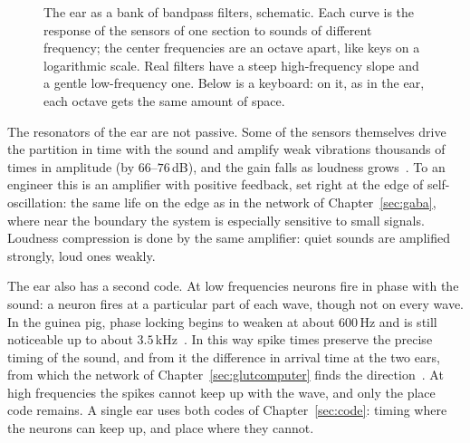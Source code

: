 \begin{figure}[t]
\centering
{}
\caption{The ear as a bank of bandpass filters, schematic. Each curve is the response of the sensors of one section to sounds of different frequency; the center frequencies are an octave apart, like keys on a logarithmic scale. Real filters have a steep high-frequency slope and a gentle low-frequency one. Below is a keyboard: on it, as in the ear, each octave gets the same amount of space.}
\label{fig:filterbank}
\end{figure}

The resonators of the ear are not passive. Some of the sensors themselves drive the partition in time with the sound and amplify weak vibrations thousands of times in amplitude (by $66$--$76$\,dB), and the gain falls as loudness grows~\cite{Ruggero1997,Robles2001}. To an engineer this is an amplifier with positive feedback, set right at the edge of self-oscillation: the same life on the edge as in the network of Chapter~\ref{sec:gaba}, where near the boundary the system is especially sensitive to small signals. Loudness compression is done by the same amplifier: quiet sounds are amplified strongly, loud ones weakly.

The ear also has a second code. At low frequencies neurons fire in phase with the sound: a neuron fires at a particular part of each wave, though not on every wave. In the guinea pig, phase locking begins to weaken at about $600$\,Hz and is still noticeable up to about $3.5$\,kHz~\cite{PalmerRussell1986}. In this way spike times preserve the precise timing of the sound, and from it the difference in arrival time at the two ears, from which the network of Chapter~\ref{sec:glutcomputer} finds the direction~\cite{Grothe2010}. At high frequencies the spikes cannot keep up with the wave, and only the place code remains. A single ear uses both codes of Chapter~\ref{sec:code}: timing where the neurons can keep up, and place where they cannot.

